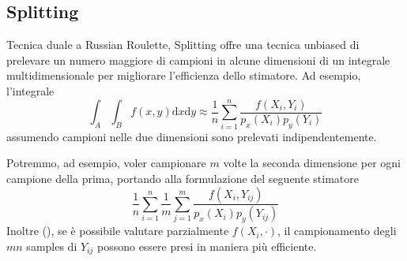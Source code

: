 \subsection{Splitting}
Tecnica duale a Russian Roulette, Splitting offre una tecnica unbiased di prelevare un numero maggiore di campioni in alcune dimensioni di un 
integrale multidimensionale per migliorare l'efficienza dello stimatore. Ad esempio, l'integrale 
\begin{equation*}
	\int_A\int_Bf(x,y)\mathrm{d}x\mathrm{d}y\approx\frac{1}{n}\sum_{i=1}^n\frac{f(X_i,Y_i)}{p_x(X_i)p_y(Y_i)}
\end{equation*}
assumendo campioni nelle due dimensioni sono prelevati indipendentemente.\par
Potremmo, ad esempio, voler campionare $m$ volte la seconda dimensione per ogni campione della prima, portando alla formulazione del seguente stimatore
\begin{equation*}
	\frac{1}{n}\sum_{i=1}^n\frac{1}{m}\sum_{j=1}^m\frac{f(X_i,Y_{ij})}{p_x(X_i)p_y(Y_{ij})}
\end{equation*}
Inoltre (\cite{pharr}), se \`e possibile valutare parzialmente $f(X_i,\cdot)$, il campionamento degli $mn$ samples di $Y_{ij}$ possono essere presi 
in maniera pi\`u efficiente.
